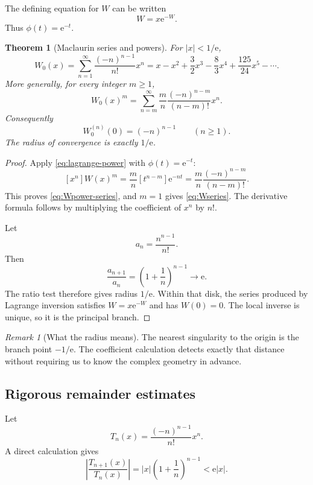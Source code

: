 \documentclass[11pt]{article}
\newtheorem{theorem}{Theorem}[section]
\theoremstyle{remark}
\newtheorem{remark}[remark]{Remark}
\newcommand{\Wz}{W_0}
\newcommand{\ee}{\mathrm e}
\newcommand{\abs}[1]{\left|#1\right|}
\begin{document}
The defining equation for \(W\) can be written
\[
       W=x\ee^{-W}.
\]
Thus \(\phi(t)=\ee^{-t}\).

\begin{theorem}[Maclaurin series and powers]\label{thm:maclaurin}
For \(\abs{x}<1/\ee\),
\begin{equation}\label{eq:Wseries}
 \boxed{\displaystyle
 \Wz(x)=\sum_{n=1}^{\infty}
       \frac{(-n)^{n-1}}{n!}x^n}
 =x-x^2+\frac32x^3-\frac83x^4
  +\frac{125}{24}x^5-\cdots.
\end{equation}
More generally, for every integer \(m\geq1\),
\begin{equation}\label{eq:Wpower-series}
 \Wz(x)^m
 =\sum_{n=m}^{\infty}
   \frac{m}{n}\frac{(-n)^{n-m}}{(n-m)!}x^n.
\end{equation}
Consequently
\begin{equation}\label{eq:derivatives-zero}
       \Wz^{(n)}(0)=(-n)^{n-1}\qquad(n\geq1).
\end{equation}
The radius of convergence is exactly \(1/\ee\).
\end{theorem}

\begin{proof}
Apply \eqref{eq:lagrange-power} with
\(\phi(t)=\ee^{-t}\):
\[
 [x^n]W(x)^m
 =\frac{m}{n}[t^{n-m}]\ee^{-nt}
 =\frac{m}{n}\frac{(-n)^{n-m}}{(n-m)!}.
\]
This proves \eqref{eq:Wpower-series}, and \(m=1\) gives
\eqref{eq:Wseries}.  The derivative formula follows by multiplying the
coefficient of \(x^n\) by \(n!\).

Let
\[
       a_n=\frac{n^{n-1}}{n!}.
\]
Then
\[
 \frac{a_{n+1}}{a_n}
 =\left(1+\frac1n\right)^{n-1}\longrightarrow\ee.
\]
The ratio test therefore gives radius \(1/\ee\).  Within that disk, the
series produced by Lagrange inversion satisfies \(W=x\ee^{-W}\) and has
\(W(0)=0\).  The local inverse is unique, so it is the principal branch.
\end{proof}

\begin{remark}[What the radius means]
The nearest singularity to the origin is the branch point \(-1/\ee\).
The coefficient calculation detects exactly that distance without requiring
us to know the complex geometry in advance.
\end{remark}

\subsection{Rigorous remainder estimates}

Let
\[
 T_n(x)=\frac{(-n)^{n-1}}{n!}x^n.
\]
A direct calculation gives
\begin{equation}\label{eq:termratio}
 \abs{\frac{T_{n+1}(x)}{T_n(x)}}
 =\abs{x}\left(1+\frac1n\right)^{n-1}
 <\ee\abs{x}.
\end{equation}
\end{document}
